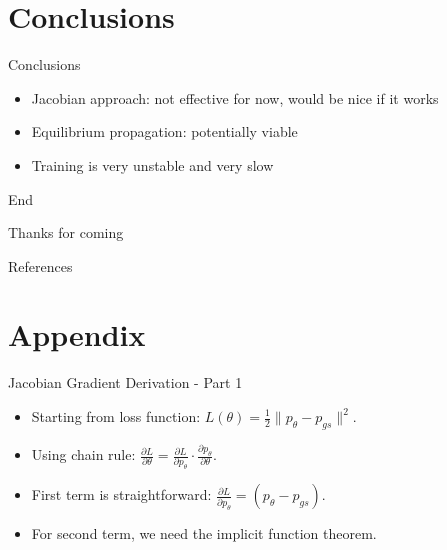 \documentclass{beamer}
\begin{document}
\section{Conclusions}
\begin{frame}{Conclusions}
  \begin{itemize}
    \item Jacobian approach: not effective for now, would be nice if it works
    \item Equilibrium propagation: potentially viable
    \item Training is very unstable and very slow

  \end{itemize}
\end{frame}

\begin{frame}{End}
\begin{center}
 Thanks for coming
\end{center}
\end{frame}
\begin{frame}[allowframebreaks]{References}
\nocite{*}


\end{frame}

\appendix
\section{Appendix}
\begin{frame}{Jacobian Gradient Derivation - Part 1}
  \begin{itemize}
    \item Starting from loss function: $L(\theta) = \frac{1}{2}\|p_{\theta} - p_{gs}\|^2$.
    \item Using chain rule: $\frac{\partial L}{\partial \theta} = \frac{\partial L}{\partial p_{\theta}} \cdot \frac{\partial p_{\theta}}{\partial \theta}$.
    \item First term is straightforward: $\frac{\partial L}{\partial p_{\theta}} = (p_{\theta} - p_{gs})$.
    \item For second term, we need the implicit function theorem.
  \end{itemize}
\end{frame}
\end{document}
